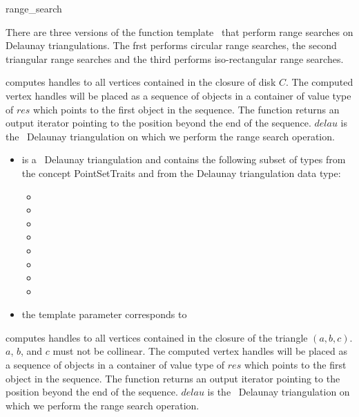 \begin{ccRefFunction}{range_search}

\ccDefinition  

There are three versions of the function template \ccRefName\ that
perform range searches on Delaunay triangulations. The frst performs
circular range searches, the second triangular range searches and the
third performs iso-rectangular range searches.


{ computes handles to all vertices contained in the closure of disk $C$.
The computed vertex handles will be placed as a sequence of objects in a container of value type
of $res$
which points to the first object in the sequence. The function
returns an output iterator pointing to the position beyond the end
of the sequence.
$delau$ is the \cgal\ Delaunay triangulation on which we perform the range search operation.}

\begin{itemize}
\item {} is a \cgal\ Delaunay triangulation and contains the following subset of types from the concept PointSetTraits and from
the Delaunay triangulation data type:
 \begin{itemize}
  \item {} 
  \item {}
  \item {} 
  \item {}   
  \item {} 
  \item {}  
  \item {} 
  \item {} 
 \end{itemize}
\item the template parameter  corresponds to 
\end{itemize}

{computes handles to all vertices contained in the closure of the triangle $(a,b,c)$.\\
\ccPrecond $a$, $b$, and $c$ must not be collinear. 
The computed vertex handles will be placed as a sequence of objects in a container of value type
of $res$
which points to the first object in the sequence. The function
returns an output iterator pointing to the position beyond the end
of the sequence. 
$delau$ is the \cgal\ Delaunay triangulation on which we perform the range search operation.}


\end{ccRefFunction}
